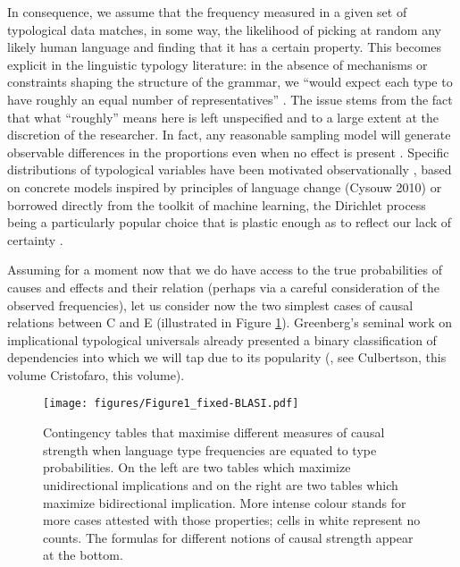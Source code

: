 \documentclass[output=paper]{langsci/langscibook}
\begin{document}
 In consequence, we assume that the frequency measured in a given set of typological data matches, in some way, the likelihood of picking at random any likely human language and finding that it has a certain property. This becomes explicit in the linguistic typology literature: in the absence of mechanisms or constraints shaping the structure of the grammar, we ``would expect each type to have roughly an equal number of representatives'' \citep{comrie1989language}. The issue stems from the fact that what ``roughly'' means here is left unspecified and to a large extent at the discretion of the researcher. In fact, any reasonable sampling model  will generate observable differences in the proportions even when no effect is present \citep{cysouw2010probability}. Specific distributions of typological variables have been motivated observationally \citep{nichols1992linguistic}, based on concrete models inspired by principles of language change  (Cysouw 2010) or borrowed directly from the toolkit of machine learning,  the Dirichlet process  being a particularly popular choice that is plastic enough as to reflect our lack of certainty \citep{daume2009non,piantadosi2014quantitative}.  
 
Assuming for a moment now that we do have access to the true probabilities of causes and effects and their relation (perhaps via a careful consideration of the observed frequencies), let us consider now the two simplest cases of causal relations between C and E (illustrated in Figure \ref{fig:Cont}). Greenberg's seminal work on implicational typological universals  already presented a binary classification of dependencies into which we will tap due to its popularity (\citealt{greenberg1966universals}, see Culbertson, this volume Cristofaro, this volume). 

\begin{figure}[t]
\texttt{[image: figures/Figure1\_fixed-BLASI.pdf]}
\caption{Contingency tables that maximise different measures of causal strength when language type frequencies are equated to type probabilities.  On the left are two tables which maximize unidirectional implications and on the right are two tables which maximize bidirectional implication.  More intense colour stands for more cases attested with those properties; cells in white represent no counts. The formulas for different notions of causal strength appear at the bottom.}
\label{fig:Cont}
\end{figure}
 
\end{document}
